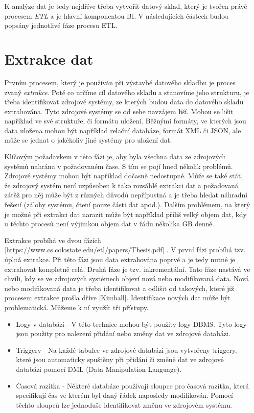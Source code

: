 K analýze dat je tedy nejdříve třeba vytvořit datový sklad, který je tvořen právě procesem \textit{ETL} a je hlavní komponentou BI. V následujících částech budou popsány jednotlivé fáze procesu ETL.

\section{Extrakce dat}

Prvním procesem, který je používán při výstavbě datového skladbu je proces zvaný \textit{extrakce}. Poté co určíme cíl datového skladu a stanovíme jeho strukturu, je třeba identifikovat zdrojové systémy, ze kterých budou data do datového skladu extrahována. Tyto zdrojové systémy se od sebe navzájem liší. Mohou se lišit například ve své struktuře, či formátu uložení. Běžnými formáty, ve kterých jsou data uložena mohou být například relační databáze, formát XML či JSON, ale může se jednat o jakékoliv jiné systémy pro uložení dat.

Klíčovým požadavkem v této fázi je, aby byla všechna data ze zdrojových systémů nahrána v požadovaném čase. S tím se pojí hned několik problémů. Zdrojové systémy mohou být například dočasně nedostupné. Může se také stát, že zdrojový systém není uzpůsoben k tako rozsáhlé extrakci dat a požadovaná zátěž pro něj může být z různých důvodů nepřípustná a je třeba hledat náhradní řešení (zálohy systému, čtení pouze části dat apod.). Dalším problémem, na který je možné při extrakci dat narazit může být například příliš velký objem dat, kdy u těchto procesů není výjimkou objem dat v řádu několika GB denně.

Extrakce probíhá ve dvou fázích [https://www.cs.colostate.edu/etl/papers/Thesis.pdf] . V první fázi probíhá tzv. úplná extrakce. Při této fázi jsou data extrahována poprvé a je tedy nutné je extrahovat kompletně celá. Druhá fáze je tzv. inkrementální. Tato fáze nastává ve chvíli, kdy se ve zdrojových systémech objeví nová nebo modifikovaná data. Nová nebo modifikovaná data je třeba identifikovat a odlišit od takových, které již procesem extrakce prošla dříve [Kimball]. Identifikace nových dat může být problematická. Můžeme k ní využít tři přístupy.

\begin{itemize}
  \item Logy v databázi - V této technice mohou být použity logy DBMS. Tyto logy jsou použity pro nalezení přidání nebo změny dat ve zdrojové databázi.
  \item Triggery - Na každé tabulce ve zdrojové databázi jsou vytvořeny triggery, které jsou automaticky spuštěny při přidání či změně dat ve zdrojové databázi pomocí DML (Data Manipulation Language). 
  \item Časová razítka - Některé databáze používají sloupce pro časová razítka, která specifikují čas ve kterém byl daný řádek naposledy modifikován. Pomocí těchto sloupců lze jednoduše identifikovat změnu ve zdrojovém systému.
\end{itemize}

